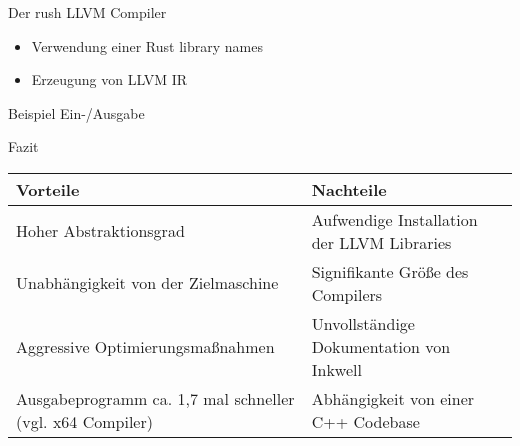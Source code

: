\begin{frame}{Der rush LLVM Compiler}
	\begin{itemize}
		\item Verwendung einer Rust library names 
		\item Erzeugung von LLVM IR
	\end{itemize}
\end{frame}

\begin{frame}{Beispiel Ein-/Ausgabe}
	\begin{minipage}{0.45\textwidth}
		\centering
	\end{minipage}
	\hfill
	\begin{minipage}{0.5\textwidth}
	\end{minipage}
\end{frame}

\begin{frame}{Fazit}
	\begin{table}[h]
		\begin{tabularx}{0.95\textwidth}{L|L}
			 Vorteile                             &  Nachteile               \\
			\hline
			Hoher Abstraktionsgrad                                    & Aufwendige Installation der LLVM Libraries \\
			Unabhängigkeit von der Zielmaschine                       & Signifikante Größe des Compilers           \\
			Aggressive Optimierungsmaßnahmen                          & Unvollständige Dokumentation von Inkwell   \\
			Ausgabeprogramm ca. 1,7 mal schneller (vgl. x64 Compiler) & Abhängigkeit von einer C++ Codebase        \\
		\end{tabularx}
	\end{table}
\end{frame}
